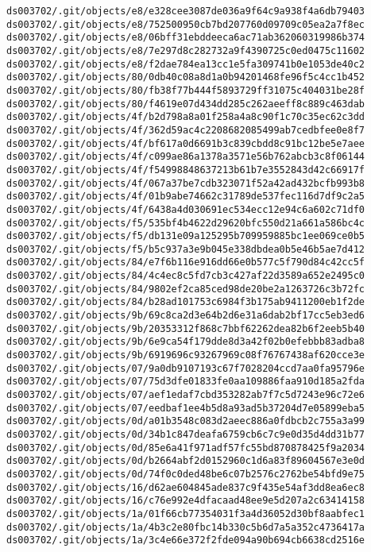 \documentclass[11pt]{article}
\begin{document}
\begin{Verbatim}[commandchars=\\\{\}]
ds003702/.git/objects/e8/e328cee3087de036a9f64c9a938f4a6db79403
ds003702/.git/objects/e8/752500950cb7bd207760d09709c05ea2a7f8ec
ds003702/.git/objects/e8/06bff31ebddeeca6ac71ab362060319986b374
ds003702/.git/objects/e8/7e297d8c282732a9f4390725c0ed0475c11602
ds003702/.git/objects/e8/f2dae784ea13cc1e5fa309741b0e1053de40c2
ds003702/.git/objects/80/0db40c08a8d1a0b94201468fe96f5c4cc1b452
ds003702/.git/objects/80/fb38f77b444f5893729ff31075c404031be28f
ds003702/.git/objects/80/f4619e07d434dd285c262aeeff8c889c463dab
ds003702/.git/objects/4f/b2d798a8a01f258a4a8c90f1c70c35ec62c3dd
ds003702/.git/objects/4f/362d59ac4c2208682085499ab7cedbfee0e8f7
ds003702/.git/objects/4f/bf617a0d6691b3c839cbdd8c91bc12be5e7aee
ds003702/.git/objects/4f/c099ae86a1378a3571e56b762abcb3c8f06144
ds003702/.git/objects/4f/f54998848637213b61b7e3552843d42c66917f
ds003702/.git/objects/4f/067a37be7cdb323071f52a42ad432bcfb993b8
ds003702/.git/objects/4f/01b9abe74662c31789de537fec116d7df9c2a5
ds003702/.git/objects/4f/6438a4d030691ec534ecc12e94c6a602c71df0
ds003702/.git/objects/f5/535bf4b4622d29620bfc550d21a661a586bc4c
ds003702/.git/objects/f5/db131e09a125295b709959885bc1ee069ce0b5
ds003702/.git/objects/f5/b5c937a3e9b045e338dbdea0b5e46b5ae7d412
ds003702/.git/objects/84/e7f6b116e916dd66e0b577c5f790d84c42cc5f
ds003702/.git/objects/84/4c4ec8c5fd7cb3c427af22d3589a652e2495c0
ds003702/.git/objects/84/9802ef2ca85ced98de20be2a1263726c3b72fc
ds003702/.git/objects/84/b28ad101753c6984f3b175ab9411200eb1f2de
ds003702/.git/objects/9b/69c8ca2d3e64b2d6e31a6dab2bf17cc5eb3ed6
ds003702/.git/objects/9b/20353312f868c7bbf62262dea82b6f2eeb5b40
ds003702/.git/objects/9b/6e9ca54f179dde8d3a42f02b0efebbb83adba8
ds003702/.git/objects/9b/6919696c93267969c08f76767438af620cce3e
ds003702/.git/objects/07/9a0db9107193c67f7028204ccd7aa0fa95796e
ds003702/.git/objects/07/75d3dfe01833fe0aa109886faa910d185a2fda
ds003702/.git/objects/07/aef1edaf7cbd353282ab7f7c5d7243e96c72e6
ds003702/.git/objects/07/eedbaf1ee4b5d8a93ad5b37204d7e05899eba5
ds003702/.git/objects/0d/a01b3548c083d2aeec886a0fdbcb2c755a3a99
ds003702/.git/objects/0d/34b1c847deafa6759cb6c7c9e0d35d4dd31b77
ds003702/.git/objects/0d/85e6a41f971adf57fc55bd870878425f9a2034
ds003702/.git/objects/0d/b2664abf2d0152960c1d6a83f89604567e3e0d
ds003702/.git/objects/0d/74f0c0ded48be6c07b2576c2762be54bfd9e75
ds003702/.git/objects/16/d62ae604845ade837c9f435e54af3dd8ea6ec8
ds003702/.git/objects/16/c76e992e4dfacaad48ee9e5d207a2c63414158
ds003702/.git/objects/1a/01f66cb77354031f3a4d36052d30bf8aabfec1
ds003702/.git/objects/1a/4b3c2e80fbc14b330c5b6d7a5a352c4736417a
ds003702/.git/objects/1a/3c4e66e372f2fde094a90b694cb6638cd2516e

\end{Verbatim}
\end{document}
